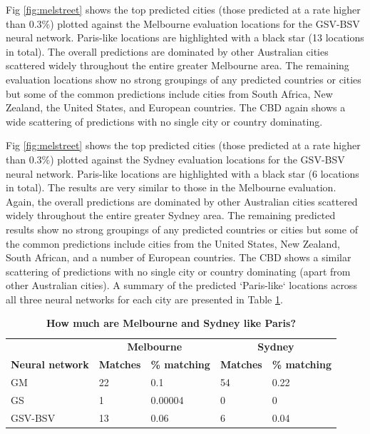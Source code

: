 \documentclass[10pt,letterpaper,hidelinks]{article}
\begin{document}
Fig \ref{fig:melstreet} shows the top predicted cities (those predicted at a rate higher than 0.3\%) plotted against the Melbourne evaluation locations for the GSV-BSV neural network. Paris-like locations are highlighted with a black star (13 locations in total). The overall predictions are dominated by other Australian cities scattered widely throughout the entire greater Melbourne area. The remaining evaluation locations show no strong groupings of any predicted countries or cities but some of the common predictions include cities from South Africa, New Zealand, the United States, and European countries. The CBD again shows a wide scattering of predictions with no single city or country dominating.


Fig \ref{fig:melstreet} shows the top predicted cities (those predicted at a rate higher than 0.3\%) plotted against the Sydney evaluation locations for the GSV-BSV neural network. Paris-like locations are highlighted with a black star (6 locations in total). The results are very similar to those in the Melbourne evaluation. Again, the overall predictions are dominated by other Australian cities scattered widely throughout the entire greater Sydney area. The remaining predicted results show no strong groupings of any predicted countries or cities but some of the common predictions include cities from the United States, New Zealand, South African, and a number of European countries. The CBD shows a similar scattering of predictions with no single city or country dominating (apart from other Australian cities). A summary of the predicted `Paris-like` locations across all three neural networks for each city are presented in Table \ref{tab:melbournesydneyparis}.

\begin{table}[!htbp]
\caption{\bf How much are Melbourne and Sydney like Paris? \label{tab:melbournesydneyparis}}     
\begin{tabular}{ l  l l l  l}
 \hline    &  \multicolumn{2}{c}{\textbf{Melbourne}} & \multicolumn{2}{c}{\textbf{Sydney}}  \\  
\textbf{Neural network} & \textbf{Matches} & \textbf{\% matching}  & \textbf{Matches} & \textbf{\% matching}\\ \hline
GM & 22 & 0.1 & 54 & 0.22 \\ 
GS & 1 & 0.00004 & 0 & 0 \\ 
GSV-BSV & 13 & 0.06 & 6 & 0.04 \\ \hline
\end{tabular}
\end{table}
\end{document}
